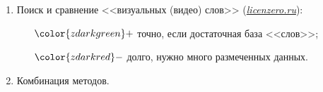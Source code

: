 {\begin{enumerate}
{\begin{itemize}
                            не применимо если нет звука.
                    \end{itemize}
                }
            \item  Поиск и сравнение <<визуальных (видео) слов>>
                (\href{http://licenzero.ru}
                    {\color{zdarkgreen}\it licenzero.ru}):
                {\tiny
                    \begin{itemize} \tiny
                        \item[${\color{zdarkgreen} +}$] точно,
                            если достаточная база <<слов>>;
                        \item[${\color{zdarkred} -}$] долго,
                            нужно много размеченных данных.
                    \end{itemize}
                }
            \item  Комбинация методов.
        \end{enumerate}
        
}
